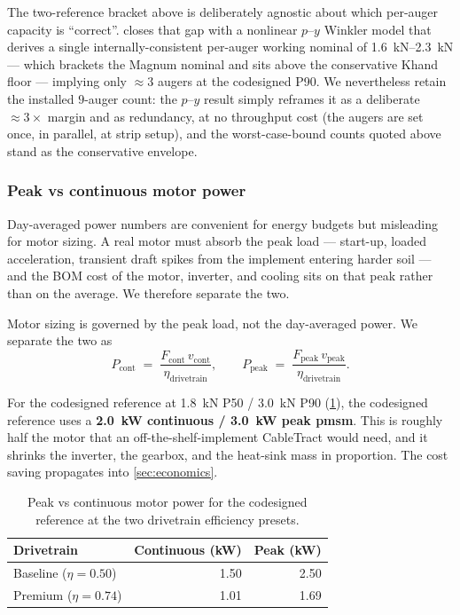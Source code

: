 \documentclass[11pt,a4paper]{article}
\begin{document}
The two-reference bracket above is deliberately agnostic about which per-auger capacity is ``correct''.  closes that gap with a nonlinear $p$--$y$ Winkler model that derives a single internally-consistent per-auger working nominal of \SIrange{1.6}{2.3}{\kilo\newton} --- which brackets the Magnum nominal and sits above the conservative Khand floor --- implying only ${\approx}3$ augers at the codesigned P90. We nevertheless retain the installed \(9\)-auger count: the $p$--$y$ result simply reframes it as a deliberate ${\approx}3\times$ margin and as redundancy, at no throughput cost (the augers are set once, in parallel, at strip setup), and the worst-case-bound counts quoted above stand as the conservative envelope.

\subsubsection{Peak vs continuous motor power}\label{sec:motor}

Day-averaged power numbers are convenient for energy budgets but misleading for motor sizing. A real motor must absorb the peak load --- start-up, loaded acceleration, transient draft spikes from the implement entering harder soil --- and the BOM cost of the motor, inverter, and cooling sits on that peak rather than on the average. We therefore separate the two.

Motor sizing is governed by the peak load, not the day-averaged power. We separate the two as
\begin{equation}\label{eq:power}
P_{\text{cont}} \;=\; \frac{F_{\text{cont}}\, v_{\text{cont}}}{\eta_{\text{drivetrain}}}, \qquad
P_{\text{peak}} \;=\; \frac{F_{\text{peak}}\, v_{\text{peak}}}{\eta_{\text{drivetrain}}}.
\end{equation}

For the codesigned reference at \SI{1.8}{\kilo\newton} P50 / \SI{3.0}{\kilo\newton} P90 (\cref{tab:motor}), the codesigned reference uses a \textbf{\SI{2.0}{\kilo\watt} continuous / \SI{3.0}{\kilo\watt} peak \gls{pmsm}}. This is roughly half the motor that an off-the-shelf-implement CableTract would need, and it shrinks the inverter, the gearbox, and the heat-sink mass in proportion. The cost saving propagates into \cref{sec:economics}.

\begin{table}[H]
\centering\small
\caption{Peak vs continuous motor power for the codesigned reference at the two drivetrain efficiency presets.}\label{tab:motor}
\begin{tabular}{lrr}
\toprule
Drivetrain & Continuous (\si{\kilo\watt}) & Peak (\si{\kilo\watt}) \\
\midrule
Baseline ($\eta = 0.50$) & 1.50 & 2.50 \\
Premium  ($\eta = 0.74$) & 1.01 & 1.69 \\
\bottomrule
\end{tabular}
\end{table}
\end{document}
